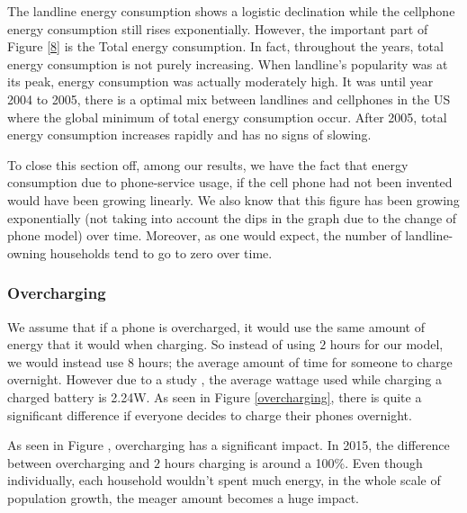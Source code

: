 \documentclass{article}
\begin{document}
The landline energy consumption shows a logistic declination while the cellphone energy consumption still rises exponentially. However, the important part of Figure \ref{8} is the Total energy consumption. In fact, throughout the years, total energy consumption is not purely increasing. When landline's popularity was at its peak, energy consumption was actually moderately high. It was until year 2004 to 2005, there is a optimal mix between landlines and cellphones in the US where the global minimum of total energy consumption occur. After 2005, total energy consumption increases rapidly and has no signs of slowing.

To close this section off, among our results, we have the fact that energy consumption due to phone-service usage, if the cell phone had not been invented would have been growing linearly. We also know that this figure has been growing exponentially (not taking into account the dips in the graph due to the change of phone model) over time. Moreover, as one would expect, the number of landline-owning households tend to go to zero over time. \par

\subsubsection{Overcharging}
We assume that if a phone is overcharged, it would use the same amount of energy that it would when charging. So instead of using $2$ hours for our model, we would instead use $8$ hours; the average amount of time for someone to charge overnight. However due to a study \cite{overCharge}, the average wattage used while charging a charged battery is 2.24W. As seen in Figure \ref{overcharging}, there is quite a significant difference if everyone decides to charge their phones overnight.\par

As seen in Figure \cite{overCharge}, overcharging has a significant impact. In 2015, the difference between overcharging and $2$ hours charging is around a 100\%. Even though individually, each household wouldn't spent much energy, in the whole scale of population growth, the meager amount becomes a huge impact.
\end{document}
